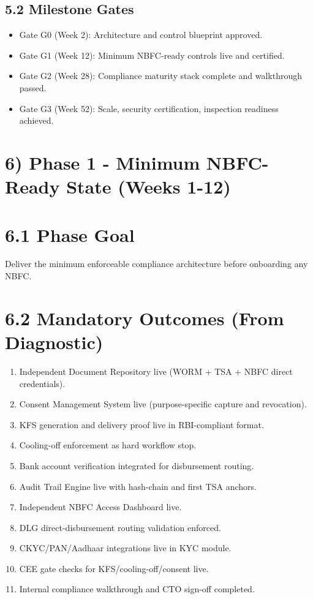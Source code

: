 ﻿\documentclass[12pt]{article}
\begin{document}
\subsection{5.2 Milestone Gates}


\begin{itemize}
\item Gate G0 (Week 2): Architecture and control blueprint approved.
\item Gate G1 (Week 12): Minimum NBFC-ready controls live and certified.
\item Gate G2 (Week 28): Compliance maturity stack complete and walkthrough passed.
\item Gate G3 (Week 52): Scale, security certification, inspection readiness achieved.
\end{itemize}

\section{6) Phase 1 - Minimum NBFC-Ready State (Weeks 1-12)}


\section{6.1 Phase Goal}


Deliver the minimum enforceable compliance architecture before onboarding any NBFC.


\section{6.2 Mandatory Outcomes (From Diagnostic)}


\begin{enumerate}
\item Independent Document Repository live (WORM + TSA + NBFC direct credentials).
\item Consent Management System live (purpose-specific capture and revocation).
\item KFS generation and delivery proof live in RBI-compliant format.
\item Cooling-off enforcement as hard workflow stop.
\item Bank account verification integrated for disbursement routing.
\item Audit Trail Engine live with hash-chain and first TSA anchors.
\item Independent NBFC Access Dashboard live.
\item DLG direct-disbursement routing validation enforced.
\item CKYC/PAN/Aadhaar integrations live in KYC module.
\item CEE gate checks for KFS/cooling-off/consent live.
\item Internal compliance walkthrough and CTO sign-off completed.
\end{enumerate}
\end{document}
